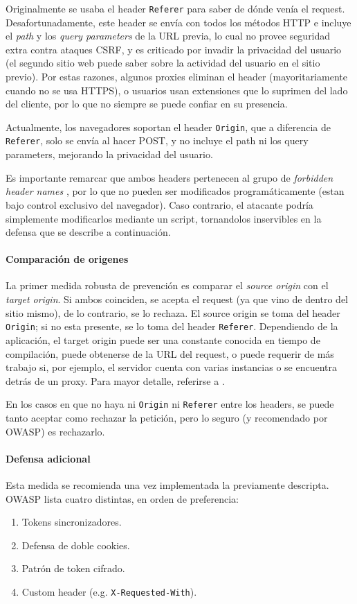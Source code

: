 \documentclass{article}
\theoremstyle{definition}
\begin{document}
Originalmente se usaba el header \texttt{Referer} para saber de dónde venía el
request. Desafortunadamente, este header se envía con todos los métodos HTTP e
incluye el \textit{path} y los \textit{query parameters} de la URL previa, lo
cual no provee seguridad extra contra ataques CSRF, y es criticado por invadir la privacidad
del usuario (el segundo sitio web puede saber sobre la actividad del usuario
en el sitio previo). Por estas razones, algunos proxies eliminan el header
(mayoritariamente cuando no se usa HTTPS), o usuarios usan extensiones que lo
suprimen del lado del cliente, por lo que no siempre se puede confiar en su
presencia.

Actualmente, los navegadores soportan el header \texttt{Origin}, que a
diferencia de \texttt{Referer}, solo se envía al hacer POST, y no incluye el
path ni los query parameters, mejorando la privacidad del usuario.

Es importante remarcar que ambos headers pertenecen al grupo de
\textit{forbidden header names} \cite{fetch}, por lo que no pueden ser modificados
programáticamente (estan bajo control exclusivo del navegador). Caso
contrario, el atacante podría simplemente modificarlos mediante un script,
tornandolos inservibles en la defensa que se describe a continuación.

\paragraph{Comparación de origenes} La primer medida robusta de
prevención es comparar el \textit{source origin} con el \textit{target origin}.
Si ambos coinciden, se acepta el request (ya que vino de dentro del
sitio mismo), de lo contrario, se lo rechaza.
El source origin se toma del header \verb+Origin+; si no esta presente, se lo
toma del header \verb+Referer+.
Dependiendo de la aplicación, el target origin puede ser una constante conocida
en tiempo de compilación, puede obtenerse de la URL del request, o puede
requerir de más trabajo si, por ejemplo, el servidor cuenta con varias
instancias o se encuentra detrás de un proxy. Para mayor detalle, referirse a
\cite{owasp}.

En los casos en que no haya ni \verb+Origin+ ni \verb+Referer+ entre los
headers, se puede tanto aceptar como rechazar la petición, pero lo seguro (y
recomendado por OWASP) es rechazarlo.

\paragraph{Defensa adicional} Esta medida se recomienda una vez implementada la
previamente descripta. OWASP lista cuatro distintas, en orden de preferencia:
\begin{enumerate}
  \itemsep 0pt
  \item Tokens sincronizadores.
  \item Defensa de doble cookies.
  \item Patrón de token cifrado.
  \item Custom header (e.g. \texttt{X-Requested-With}).
\end{enumerate}
\end{document}
